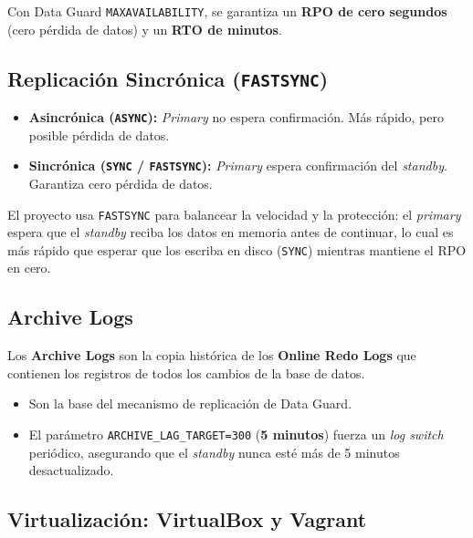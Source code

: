 \documentclass[11pt, a4paper]{report}
\begin{document}
Con Data Guard \texttt{MAXAVAILABILITY}, se garantiza un \textbf{RPO de cero segundos} (cero pérdida de datos) y un \textbf{RTO de minutos}.
\subsection{Replicación Sincrónica (\texttt{FASTSYNC})}

\begin{itemize}
    \item \textbf{Asincrónica (\texttt{ASYNC}):} \textit{Primary} no espera confirmación. Más rápido, pero posible pérdida de datos.
\item \textbf{Sincrónica (\texttt{SYNC} / \texttt{FASTSYNC}):} \textit{Primary} espera confirmación del \textit{standby}. Garantiza cero pérdida de datos.
\end{itemize}

El proyecto usa \texttt{FASTSYNC} para balancear la velocidad y la protección: el \textit{primary} espera que el \textit{standby} reciba los datos en memoria antes de continuar, lo cual es más rápido que esperar que los escriba en disco (\texttt{SYNC}) mientras mantiene el RPO en cero.
\subsection{Archive Logs}

Los \textbf{Archive Logs} son la copia histórica de los \textbf{Online Redo Logs} que contienen los registros de todos los cambios de la base de datos.
\begin{itemize}
    \item Son la base del mecanismo de replicación de Data Guard.
\item El parámetro \texttt{ARCHIVE\_LAG\_TARGET=300} (\textbf{5 minutos}) fuerza un \textit{log switch} periódico, asegurando que el \textit{standby} nunca esté más de 5 minutos desactualizado.
\end{itemize}

\subsection{Virtualización: VirtualBox y Vagrant}
\end{document}
